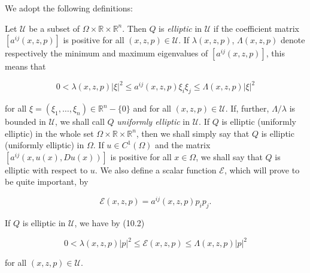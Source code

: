 We adopt the following definitions:

Let $\mathcal{U}$ be a subset of $\Omega\times\mathbb{R}\times\mathbb{R}^n$. Then $Q$ is \emph{elliptic} in $\mathcal{U}$ if the coefficient matrix $[a^{ij}(x,z,p)]$ is positive for all $(x,z,p)\in\mathcal{U}$. If $\lambda(x,z,p)$, $\Lambda(x,z,p)$ denote respectively the minimum and maximum eigenvalues of $[a^{ij}(x,z,p)]$, this means that

\begin{equation}
0<\lambda(x,z,p)|\xi|^2\le a^{ij}(x,z,p)\xi_i\xi_j\le \Lambda(x,z,p)|\xi|^2
\tag{10.2}
\end{equation}

for all $\xi=(\xi_1,\dots,\xi_n)\in\mathbb{R}^n-\{0\}$ and for all $(x,z,p)\in\mathcal{U}$. If, further, $\Lambda/\lambda$ is bounded in $\mathcal{U}$, we shall call $Q$ \emph{uniformly elliptic} in $\mathcal{U}$. If $Q$ is elliptic (uniformly elliptic) in the whole set $\Omega\times\mathbb{R}\times\mathbb{R}^n$, then we shall simply say that $Q$ is elliptic (uniformly elliptic) in $\Omega$. If $u\in C^1(\Omega)$ and the matrix $[a^{ij}(x,u(x),Du(x))]$ is positive for all $x\in\Omega$, we shall say that $Q$ is elliptic with respect to $u$. We also define a scalar function $\mathcal{E}$, which will prove to be quite important, by

\begin{equation}
\mathcal{E}(x,z,p)=a^{ij}(x,z,p)p_ip_j.
\tag{10.3}
\end{equation}

If $Q$ is elliptic in $\mathcal{U}$, we have by (10.2)

\begin{equation}
0<\lambda(x,z,p)|p|^2\le \mathcal{E}(x,z,p)\le \Lambda(x,z,p)|p|^2
\tag{10.4}
\end{equation}

for all $(x,z,p)\in\mathcal{U}$.
